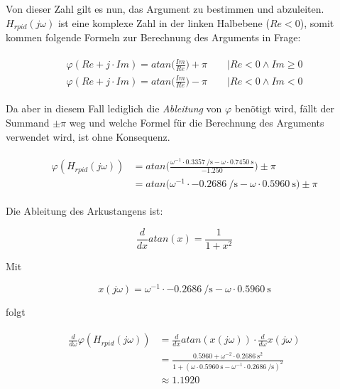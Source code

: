 Von   dieser   Zahl   gilt   es   nun,   das   Argument   zu   bestimmen   und
abzuleiten. $H_{rpid}(j\omega)$ ist eine komplexe Zahl in der linken Halbebene
($Re <  0$), somit  kommen folgende  Formeln zur  Berechnung des  Arguments in
Frage:

\begin{gather} \label{eq:app:argument}
    \begin{split}
        \varphi(Re + j \cdot Im) = atan \biggl( \frac{Im}{Re} \biggr) + \pi \hspace{2em} \biggr \rvert Re < 0 \land Im \geq 0 \\
        \varphi(Re + j \cdot Im) = atan \biggl( \frac{Im}{Re} \biggr) - \pi \hspace{2em} \biggr \rvert Re < 0 \land Im < 0
    \end{split}
\end{gather}

Da aber in diesem Fall lediglich die \emph{Ableitung} von $\varphi$ ben\"otigt
wird, f\"allt der Summand $\pm\pi$ weg  und welche Formel f\"ur die Berechnung
des  Arguments   verwendet  wird,  ist  ohne   Konsequenz.

\begin{gather} \label{eq:app:argument_numerical}
    \begin{split}
        \varphi(H_{rpid}(j\omega)) & = atan \biggl( \frac{ \omega^{-1} \cdot \SI{0.3357}{\per\second} - \omega \cdot \SI{0.7450}{\second} }{ -1.250 } \biggr) \pm \pi \\
                                   & = atan \biggl( \omega^{-1} \cdot \SI{-0.2686}{\per\second}       - \omega \cdot \SI{0.5960}{\second}             \biggr) \pm \pi
    \end{split}
\end{gather}

Die Ableitung des Arkustangens ist:

\begin{equation} \label{eq:app:d_atan}
    \frac{d}{dx} atan(x) = \frac{1}{1+x^2}
\end{equation}

Mit

\begin{equation} \label{eq:app:x_of_omega}
    x(j\omega) = \omega^{-1} \cdot \SI{-0.2686}{\per\second} - \omega \cdot \SI{0.5960}{\second}
\end{equation}

folgt

\begin{gather} \label{eq:app:d_argument}
    \begin{split}
        \frac{d}{d\omega} \varphi(H_{rpid}(j\omega)) & = \frac{d}{dx} atan(x(j\omega)) \cdot \frac{d}{d\omega} x(j\omega) \\
                                                     & = \frac{0.5960 + \omega^{-2} \cdot \SI{0.2686}{\square\second}}{1+(\omega \cdot \SI{0.5960}{\second} - \omega^{-1} \cdot \SI{0.2686}{\per\second})^2} \\
                                                     & \approx 1.1920
    \end{split}
\end{gather}


